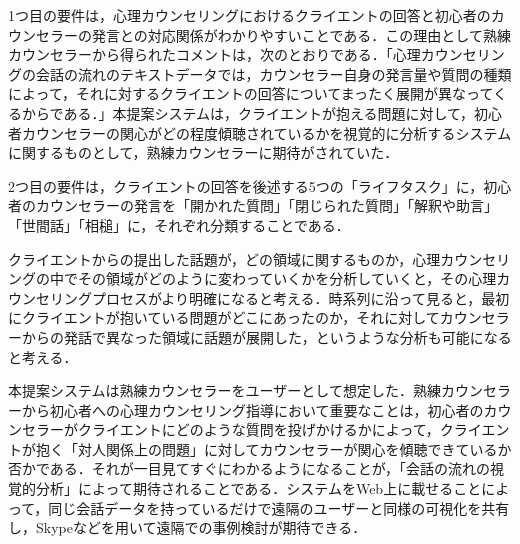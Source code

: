 \documentclass[shuuron]{kuee}
\begin{document}
1つ目の要件は，心理カウンセリングにおけるクライエントの回答と初心者のカウンセラーの発言との対応関係がわかりやすいことである．この理由として熟練カウンセラーから得られたコメントは，次のとおりである．「心理カウンセリングの会話の流れのテキストデータでは，カウンセラー自身の発言量や質問の種類によって，それに対するクライエントの回答についてまったく展開が異なってくるからである．」本提案システムは，クライエントが抱える問題に対して，初心者カウンセラーの関心がどの程度傾聴されているかを視覚的に分析するシステムに関するものとして，熟練カウンセラーに期待がされていた．

2つ目の要件は，クライエントの回答を後述する5つの「ライフタスク」に，初心者のカウンセラーの発言を「開かれた質問」「閉じられた質問」「解釈や助言」「世間話」「相槌」に，それぞれ分類することである．%

クライエントからの提出した話題が，どの領域に関するものか，心理カウンセリングの中でその領域がどのように変わっていくかを分析していくと，その心理カウンセリングプロセスがより明確になると考える．時系列に沿って見ると，最初にクライエントが抱いている問題がどこにあったのか，それに対してカウンセラーからの発話で異なった領域に話題が展開した，というような分析も可能になると考える．

本提案システムは熟練カウンセラーをユーザーとして想定した．熟練カウンセラーから初心者への心理カウンセリング指導において重要なことは，初心者のカウンセラーがクライエントにどのような質問を投げかけるかによって，クライエントが抱く「対人関係上の問題」に対してカウンセラーが関心を傾聴できているか否かである．それが一目見てすぐにわかるようになることが，「会話の流れの視覚的分析」によって期待されることである．システムをWeb上に載せることによって，同じ会話データを持っているだけで遠隔のユーザーと同様の可視化を共有し，Skypeなどを用いて遠隔での事例検討が期待できる．




%



\end{document}
